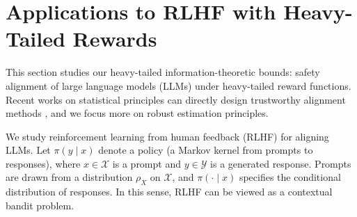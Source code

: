 \documentclass[11pt]{article}
\DeclareMathOperator{\clip}{clip}
\begin{document}


\section{Applications to RLHF with Heavy-Tailed Rewards}\label{sec:rlhf}

This section studies our heavy-tailed information-theoretic bounds: safety alignment of large language models (LLMs) under heavy-tailed reward functions. Recent works on statistical principles can directly design  trustworthy alignment methods \citep{su2026large}, and we focus more on robust estimation principles.


We study reinforcement learning from human feedback (RLHF) for aligning LLMs.
 Let $\pi(y\mid x)$ denote a policy (a Markov kernel from prompts to responses),
where $x\in\mathcal X$ is a prompt and $y\in\mathcal Y$ is a generated response.
Prompts are drawn from a distribution $\rho_X$ on $\mathcal X$, and
$\pi(\cdot\mid x)$ specifies the conditional distribution of responses.
In this sense, RLHF can be viewed as a contextual bandit problem.
\end{document}
